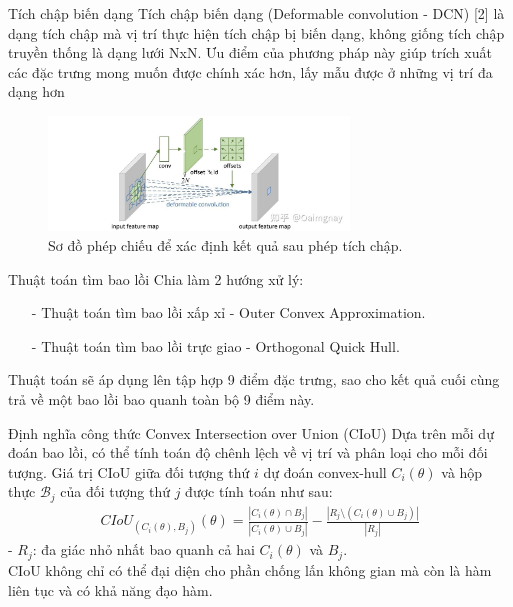 \documentclass[11pt]{beamer}
\theoremstyle{definition}
\theoremstyle{plain}
\theoremstyle{plain}
\theoremstyle{remark}
\begin{document}
	\begin{frame}{Tích chập biến dạng}
		Tích chập biến dạng (Deformable convolution - DCN) [2] là dạng tích chập
		mà vị trí thực hiện tích chập bị biến dạng, không giống tích chập truyền thống
		là dạng lưới NxN. Ưu điểm của phương pháp này giúp trích xuất các đặc trưng
		mong muốn được chính xác hơn, lấy mẫu được ở những vị trí đa dạng hơn 
		
		\begin{figure}[ht!]
			\begin{center}
				\includegraphics[width=8cm]{./Hinh_6.jpg}
				\caption{Sơ đồ phép chiếu để xác định kết quả sau phép tích chập.}
				\label{fig_dhandang6 }
			\end{center}
		\end{figure}
		
	\end{frame}
	
	
	\begin{frame}{Thuật toán tìm bao lồi}
		Chia làm 2 hướng xử lý:
		\begin{itemize}
			\item[-] Thuật toán tìm bao lồi xấp xỉ - Outer Convex Approximation.
			
			\item[-]  Thuật toán tìm bao lồi trực giao - Orthogonal Quick Hull.
			
		\end{itemize}
		Thuật toán sẽ áp dụng lên tập hợp 9 điểm đặc trưng, sao cho kết quả cuối cùng trả về một bao lồi bao quanh toàn bộ 9 điểm này.
	\end{frame}
	
	\begin{frame}{Định nghĩa công thức Convex Intersection over Union (CIoU)}
		Dựa trên mỗi dự đoán bao lồi, có thể tính toán độ chênh lệch về vị trí và phân loại cho mỗi đối tượng. Giá trị CIoU giữa đối tượng thứ $i$ dự đoán convex-hull $C_i (\theta)$ và hộp thực $\mathcal{B}_j$ của đối tượng thứ $j$ được tính toán như sau:
		\begin{align} \label{ptdd}
			CIoU_{(C_i (\theta), B_j)} (\theta) = \frac{|C_i(\theta) \cap B_j|}{|C_i(\theta) \cup B_j|} - \frac{|R_j \setminus (C_i(\theta) \cup B_j)|}{|R_j|}
		\end{align}
		- $R_j$: đa giác nhỏ nhất bao quanh cả hai $C_i(\theta)$ và $B_j$.\\
		CIoU không chỉ có thể đại diện cho phần chống lấn không gian mà còn là hàm liên tục và có khả năng đạo hàm.
	\end{frame}
	
\end{document}
